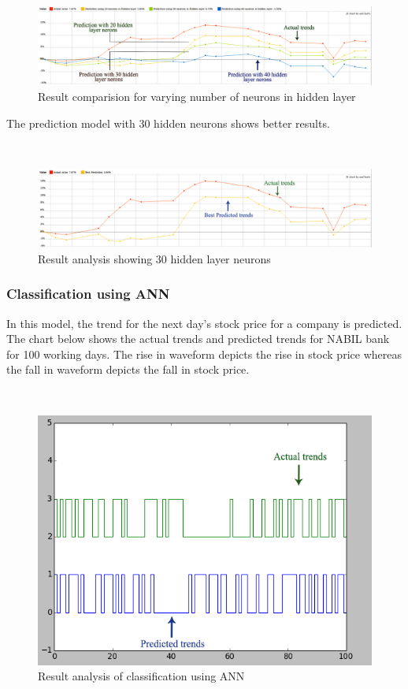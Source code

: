 ~

\begin{figure}[H]\centering
  \includegraphics[width=\textwidth]{fig/prediction1}
  \caption{Result comparision for varying number of neurons in hidden layer}
  \label{fig:prediction1}
\end{figure}

The prediction model with 30 hidden neurons shows better results. 

~

\begin{figure}[H]\centering
  \includegraphics[width=\textwidth]{fig/pred}
  \caption{Result analysis showing 30 hidden layer neurons}
  \label{fig:pred}
\end{figure}

\subsubsection{Classification using ANN}
In this model, the trend for the next day's stock price for a company is predicted. The chart below shows the actual trends and predicted trends for NABIL bank for 100 working days.
The rise in waveform depicts the rise in stock price whereas the fall in waveform depicts the fall in stock price.

~

\begin{figure}[H]\centering
  \includegraphics[width=\textwidth]{fig/ann}
  \caption{Result analysis of classification using ANN}
  \label{fig:ann}
\end{figure}

